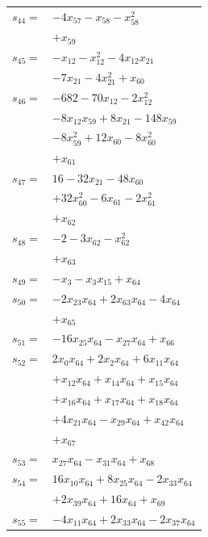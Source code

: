 \begin{longtable}{@{}r@{\;}l@{}}
\(s_{44}=\) & \(\displaystyle -4x_{57} -x_{58} -x_{58}^{2}\) \\
 & \(\displaystyle +x_{59}\) \\[3pt]
\(s_{45}=\) & \(\displaystyle -x_{12} -x_{12}^{2} -4x_{12}x_{21}\) \\
 & \(\displaystyle -7x_{21} -4x_{21}^{2} +x_{60}\) \\[3pt]
\(s_{46}=\) & \(\displaystyle -682 -70x_{12} -2x_{12}^{2}\) \\
 & \(\displaystyle -8x_{12}x_{59} +8x_{21} -148x_{59}\) \\
 & \(\displaystyle -8x_{59}^{2} +12x_{60} -8x_{60}^{2}\) \\
 & \(\displaystyle +x_{61}\) \\[3pt]
\(s_{47}=\) & \(\displaystyle 16 -32x_{21} -48x_{60}\) \\
 & \(\displaystyle +32x_{60}^{2} -6x_{61} -2x_{61}^{2}\) \\
 & \(\displaystyle +x_{62}\) \\[3pt]
\(s_{48}=\) & \(\displaystyle -2 -3x_{62} -x_{62}^{2}\) \\
 & \(\displaystyle +x_{63}\) \\[3pt]
\(s_{49}=\) & \(\displaystyle -x_{3} -x_{3}x_{15} +x_{64}\) \\[3pt]
\(s_{50}=\) & \(\displaystyle -2x_{23}x_{64} +2x_{63}x_{64} -4x_{64}\) \\
 & \(\displaystyle +x_{65}\) \\[3pt]
\(s_{51}=\) & \(\displaystyle -16x_{25}x_{64} -x_{27}x_{64} +x_{66}\) \\[3pt]
\(s_{52}=\) & \(\displaystyle 2x_{0}x_{64} +2x_{2}x_{64} +6x_{11}x_{64}\) \\
 & \(\displaystyle +x_{12}x_{64} +x_{14}x_{64} +x_{15}x_{64}\) \\
 & \(\displaystyle +x_{16}x_{64} +x_{17}x_{64} +x_{18}x_{64}\) \\
 & \(\displaystyle +4x_{21}x_{64} -x_{29}x_{64} +x_{42}x_{64}\) \\
 & \(\displaystyle +x_{67}\) \\[3pt]
\(s_{53}=\) & \(\displaystyle x_{27}x_{64} -x_{31}x_{64} +x_{68}\) \\[3pt]
\(s_{54}=\) & \(\displaystyle 16x_{10}x_{64} +8x_{25}x_{64} -2x_{33}x_{64}\) \\
 & \(\displaystyle +2x_{39}x_{64} +16x_{64} +x_{69}\) \\[3pt]
\(s_{55}=\) & \(\displaystyle -4x_{11}x_{64} +2x_{33}x_{64} -2x_{37}x_{64}\) \\

\end{longtable}
